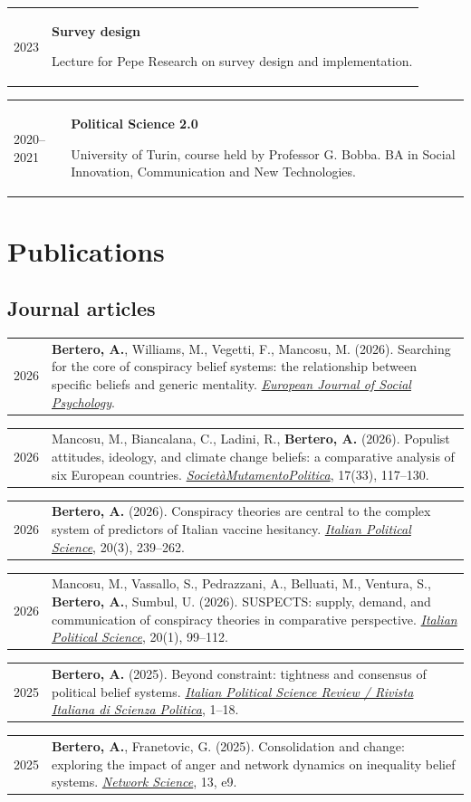 \documentclass[10pt,a4paper]{article}
\makeatletter
\newlength{\yearw}\setlength{\yearw}{2.3cm}
\newlength{\bodyw}\setlength{\bodyw}{\dimexpr\textwidth-\yearw-0.45cm\relax}
\newcommand{\cv}[2]{%
  \needspace{2\baselineskip}%
  \par\noindent
  \begin{tabular}{@{}>{\raggedright\arraybackslash}p{\yearw}@{\hspace{0.45cm}}>{\raggedright\arraybackslash}p{\bodyw}@{}}
    \sanslabel\fontsize{8.5}{10.5}\selectfont\color{muted}#1 & #2
  \end{tabular}%
  \par\vspace{3pt}%
}
\newcommand{\role}[1]{\textbf{#1}\par}
\newcommand{\venue}[1]{\textit{#1}}
\makeatother
\begin{document}
\cv{2023}{\role{Survey design}
Lecture for Pepe Research on survey design and implementation.}

\cv{2020–2021}{\role{Political Science 2.0}
University of Turin, course held by Professor G. Bobba. BA in Social Innovation, Communication and New Technologies.}

\section{Publications}

\subsection{Journal articles}

\cv{2026}{\textbf{Bertero, A.}, Williams, M., Vegetti, F., Mancosu, M. (2026). Searching for the core of conspiracy belief systems: the relationship between specific beliefs and generic mentality. \href{https://doi.org/10.1002/ejsp.70122}{\venue{European Journal of Social Psychology}}.}

\cv{2026}{Mancosu, M., Biancalana, C., Ladini, R., \textbf{Bertero, A.} (2026). Populist attitudes, ideology, and climate change beliefs: a comparative analysis of six European countries. \href{https://doi.org/10.36253/smp-16840}{\venue{SocietàMutamentoPolitica}}, 17(33), 117–130.}

\cv{2026}{\textbf{Bertero, A.} (2026). Conspiracy theories are central to the complex system of predictors of Italian vaccine hesitancy. \href{https://doi.org/10.69101/IPS.2025.20.3.3}{\venue{Italian Political Science}}, 20(3), 239–262.}

\cv{2026}{Mancosu, M., Vassallo, S., Pedrazzani, A., Belluati, M., Ventura, S., \textbf{Bertero, A.}, Sumbul, U. (2026). SUSPECTS: supply, demand, and communication of conspiracy theories in comparative perspective. \href{https://doi.org/10.69101/IPS.2025.20.1.4}{\venue{Italian Political Science}}, 20(1), 99–112.}

\cv{2025}{\textbf{Bertero, A.} (2025). Beyond constraint: tightness and consensus of political belief systems. \href{https://doi.org/10.1017/ipo.2025.10080}{\venue{Italian Political Science Review / Rivista Italiana di Scienza Politica}}, 1–18.}

\cv{2025}{\textbf{Bertero, A.}, Franetovic, G. (2025). Consolidation and change: exploring the impact of anger and network dynamics on inequality belief systems. \href{https://doi.org/10.1017/nws.2025.10004}{\venue{Network Science}}, 13, e9.}
\end{document}
